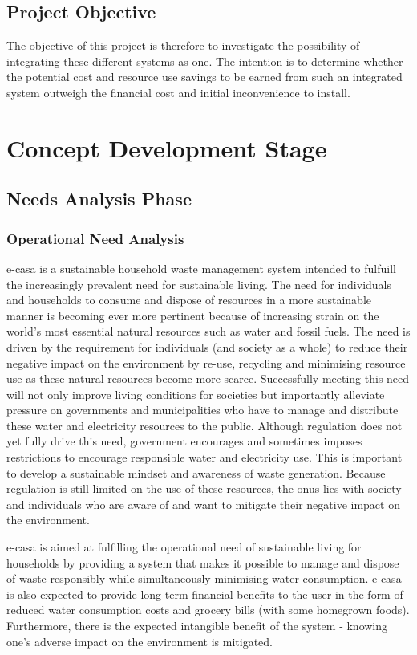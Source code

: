 \documentclass[a4paper,11pt,fleqn]{report}
\begin{document}
\section{Project Objective} \label{sec: Project Objective}
The objective of this project is therefore to investigate the possibility of integrating these different systems as one. The intention is to determine whether the potential cost and resource use savings to be earned from such an integrated system outweigh the financial cost and initial inconvenience to install.

\chapter{Concept Development Stage}
\section{Needs Analysis Phase} \label{sec: Needs Analysis Phase}
\subsection{Operational Need Analysis} \label{Ssec: Operational Need}
\ac{e-casa} is a sustainable household waste management system intended to fulfuill the increasingly prevalent need for sustainable living. The need for individuals and households to consume and dispose of resources in a more sustainable manner is becoming ever more pertinent because of increasing strain on the world's most essential natural resources such as water and fossil fuels. The need is driven by the requirement for individuals (and society as a whole) to reduce their negative impact on the environment by re-use, recycling and minimising resource use as these natural resources become more scarce. Successfully meeting this need will not only improve living conditions for societies but importantly alleviate pressure on governments and municipalities who have to manage and distribute these water and electricity resources to the public.
Although regulation does not yet fully drive this need, government encourages and sometimes imposes restrictions to encourage responsible water and electricity use. This is important to develop a sustainable mindset and awareness of waste generation. Because regulation is still limited on the use of these resources, the onus lies with society and individuals who are aware of and want to mitigate their negative impact on the environment.

\ac{e-casa} is aimed at fulfilling the operational need of sustainable living for households by providing a system that makes it possible to manage and dispose of waste responsibly while simultaneously minimising water consumption. \ac{e-casa} is also expected to provide long-term financial benefits to the user in the form of reduced water consumption costs and grocery bills (with some homegrown foods). Furthermore, there is the expected intangible benefit of the system - knowing one's adverse impact on the environment is mitigated.
\end{document}
